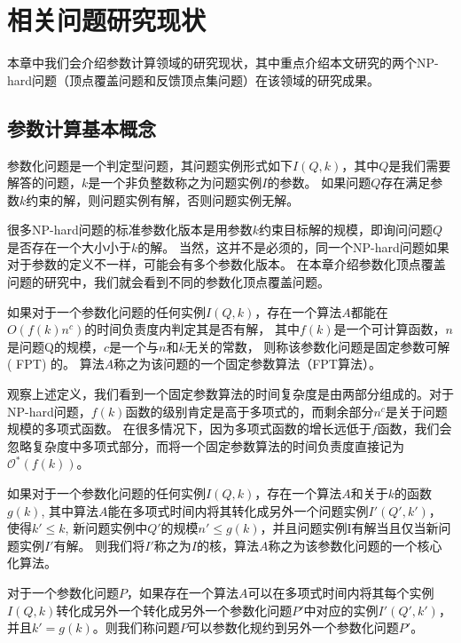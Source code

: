 \chapter{相关问题研究现状}
本章中我们会介绍参数计算领域的研究现状，其中重点介绍本文研究的两个NP-hard问题（顶点覆盖问题和反馈顶点集问题）在该领域的研究成果。
\section{参数计算基本概念}
\begin{definition} [参数化问题]
参数化问题是一个判定型问题，其问题实例形式如下$I(Q, k)$，其中$Q$是我们需要解答的问题，$k$是一个非负整数称之为问题实例$I$的参数。
如果问题$Q$存在满足参数$k$约束的解，则问题实例有解，否则问题实例无解。
\end{definition}

很多NP-hard问题的标准参数化版本是用参数$k$约束目标解的规模，即询问问题$Q$是否存在一个大小小于$k$的解。
当然，这并不是必须的，同一个NP-hard问题如果对于参数的定义不一样，可能会有多个参数化版本。
在本章介绍参数化顶点覆盖问题的研究中，我们就会看到不同的参数化顶点覆盖问题。

\begin{definition}  \label{def_fpt}
如果对于一个参数化问题的任何实例$I(Q, k)$，存在一个算法$A$都能在$O(f(k)n^c)$的时间负责度内判定其是否有解，
其中$f(k)$是一个可计算函数，$n$是问题Q的规模，$c$是一个与$n$和$k$无关的常数，
则称该参数化问题是固定参数可解( FPT) 的。
算法$A$称之为该问题的一个固定参数算法（FPT算法）。
\end{definition}

观察上述定义，我们看到一个固定参数算法的时间复杂度是由两部分组成的。对于NP-hard问题，$f(k)$函数的级别肯定是高于多项式的，而剩余部分$n^c$是关于问题规模的多项式函数。
在很多情况下，因为多项式函数的增长远低于$f$函数，我们会忽略复杂度中多项式部分，而将一个固定参数算法的时间负责度直接记为$\mathcal{O}^*(f(k))$。

\begin{definition}[核(kernel)]
如果对于一个参数化问题的任何实例$I(Q, k)$，存在一个算法$A$和关于$k$的函数$g(k)$,
其中算法$A$能在多项式时间内将其转化成另外一个问题实例$I'(Q',k')$，
使得$k' \le k$, 新问题实例中$Q'$的规模$n' \le g(k)$，并且问题实例I有解当且仅当新问题实例$I'$有解。
则我们将$I'$称之为$I$的核，算法$A$称之为该参数化问题的一个核心化算法。
\end{definition}

\begin{definition}
对于一个参数化问题$P$，如果存在一个算法$A$可以在多项式时间内将其每个实例$I(Q, k)$转化成另外一个转化成另外一个参数化问题$P'$中对应的实例$I'(Q', k')$，
并且$k' = g(k)$。则我们称问题$P$可以参数化规约到另外一个参数化问题$P'$。
\end{definition}

